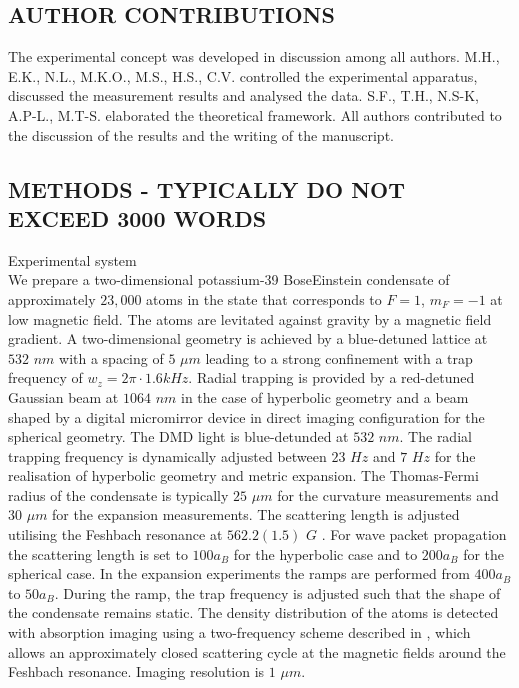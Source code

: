 \documentclass[11pt,twocolumn,letterpaper]{article}
\newcounter{ns}
\begin{document}
\begin{center}
    \section{ AUTHOR CONTRIBUTIONS}
    \addtocounter{ns}{1}
\end{center}

The experimental concept was developed in discussion among all authors. M.H., E.K., N.L., M.K.O., M.S., H.S., C.V. controlled the experimental apparatus, discussed the measurement results and analysed the data. S.F., T.H., N.S-K, A.P-L., M.T-S. elaborated the theoretical framework. All authors contributed to the discussion of the results and the writing of the manuscript.\\

\begin{center}
    \section{ METHODS - TYPICALLY DO NOT
    EXCEED 3000 WORDS}
    \addtocounter{ns}{1}
\end{center}

Experimental system\\

We prepare a two-dimensional potassium-39 BoseEinstein condensate of approximately $23,000$ atoms in the state that corresponds to $F = 1$, $m_{F} = −1$ at low magnetic field. The atoms are levitated against gravity by a magnetic field gradient. A two-dimensional geometry is achieved by a blue-detuned lattice at $532$ $nm$ with a spacing of $5$ $\mu m$ leading to a strong confinement with a trap frequency of $w_{z} = 2\pi \cdot 1.6 kHz$. Radial trapping is provided by a red-detuned Gaussian beam at $1064$ $nm$ in the case of hyperbolic geometry and a beam shaped by a digital micromirror device in direct imaging configuration for the spherical geometry. The DMD light is blue-detunded at $532$ $nm$. The radial trapping frequency is dynamically adjusted between $23$ $Hz$ and $7$ $Hz$ for the realisation of hyperbolic geometry and metric expansion. The Thomas-Fermi radius of the condensate is typically $25$ $\mu m$ for the curvature measurements and $30$ $\mu m$ for the expansion measurements. The scattering length is adjusted utilising the Feshbach resonance at $562.2(1.5)$ $G$ \cite{Lb.28}. For wave packet propagation the scattering length is set to $100a_{B}$ for the hyperbolic case and to $200a_{B}$ for the spherical case. In the expansion experiments the ramps are performed from $400a_{B}$ to $50a_{B}$. During the ramp, the trap frequency is adjusted such that the shape of the condensate remains static. The density distribution of the atoms is detected with absorption imaging using a two-frequency scheme described in \cite{Lb.45}, which allows an approximately closed scattering cycle at the magnetic fields around the Feshbach resonance. Imaging resolution is $1$ $\mu m$.\\
\end{document}
